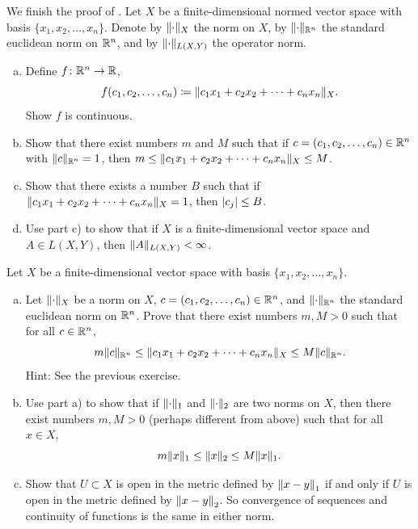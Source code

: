 \begin{exercise}
\pagebreak[1]
We finish the proof of .
Let $X$ be a finite-dimensional normed vector space with basis
$\{ x_1,x_2,\ldots,x_n \}$.  Denote by $\lVert {\cdot} \rVert_X$ the norm on $X$,
by $\lVert {\cdot} \rVert_{{\mathbb{R}}^n}$ the standard euclidean norm on ${\mathbb{R}}^n$, and
by $\lVert {\cdot} \rVert_{L(X,Y)}$ the operator norm.
\begin{enumerate}[a)]
\item
Define $f \colon {\mathbb{R}}^n \to {\mathbb{R}}$,
\begin{equation*}
f(c_1,c_2,\ldots,c_n) \coloneqq 
\lVert {c_1 x_1 + c_2 x_2 + \cdots + c_n x_n} \rVert_X .
\end{equation*}
Show $f$ 
is continuous.
\item
Show that there exist numbers $m$ and $M$ such
that if $c = (c_1,c_2,\ldots,c_n) \in {\mathbb{R}}^n$ with
$\lVert {c} \rVert_{{\mathbb{R}}^n} = 1$, then 
$m \leq \lVert {c_1 x_1 + c_2 x_2 + \cdots + c_n x_n} \rVert_X \leq M$.
\item
Show that there exists a number $B$ such that if
$\lVert {c_1 x_1 + c_2 x_2 + \cdots + c_n x_n} \rVert_X = 1$,
then $\lvert {c_j} \rvert \leq B$.
\item
Use part c) to show that if $X$ is a finite-dimensional vector 
space and $A \in L(X,Y)$, then $\lVert {A} \rVert_{L(X,Y)} < \infty$.
\end{enumerate}
\end{exercise}

\begin{exercise} \label{exercise:allnormsequiv}
\pagebreak[3]
Let $X$ be a finite-dimensional vector space with basis
$\{ x_1,x_2,\ldots,x_n \}$.
\begin{enumerate}[a)]
\item
Let $\lVert {\cdot} \rVert_X$ be a norm on $X$,
$c = (c_1,c_2,\ldots,c_n) \in {\mathbb{R}}^n$,
and $\lVert {\cdot} \rVert_{{\mathbb{R}}^n}$ the
standard euclidean norm on ${\mathbb{R}}^n$.
Prove that there exist numbers $m,M > 0$ such that
for all $c \in {\mathbb{R}}^n$,
\begin{equation*}
m \lVert {c} \rVert_{{\mathbb{R}}^n}
\leq
\lVert {c_1 x_1 + c_2 x_2 + \cdots + c_n x_n} \rVert_X
\leq
M \lVert {c} \rVert_{{\mathbb{R}}^n} .
\end{equation*}
Hint: See the previous exercise.
\item
Use part a) to show that if
$\lVert {\cdot} \rVert_1$ and
$\lVert {\cdot} \rVert_2$ are two norms on $X$, then there exist
numbers $m,M > 0$ (perhaps different from above) such that
for all $x \in X$,
\begin{equation*}
m \lVert {x} \rVert_1
\leq
\lVert {x} \rVert_2
\leq
M \lVert {x} \rVert_1 .
\end{equation*}
\item
Show that $U \subset X$ is open in the metric defined by
$\left\lVert {x-y} \right\rVert_1$ if and only if $U$ is open in the metric defined by
$\left\lVert {x-y} \right\rVert_2$.  So convergence of sequences and continuity
of functions is the same in either norm.
\end{enumerate}
\end{exercise}

